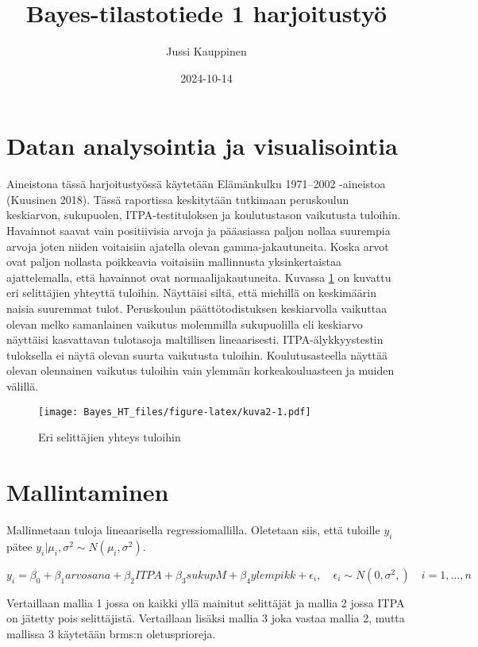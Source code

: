 \documentclass[
]{article}
\title{Bayes-tilastotiede 1 harjoitustyö}
\author{Jussi Kauppinen}
\date{2024-10-14}
\begin{document}
\maketitle

{
\setcounter{tocdepth}{2}
\tableofcontents
}
\section{Datan analysointia ja visualisointia}\label{datan-analysointia-ja-visualisointia}

Aineistona tässä harjoitustyössä käytetään Elämänkulku 1971--2002 -aineistoa (Kuusinen 2018). Tässä raportissa keskitytään tutkimaan peruskoulun keskiarvon, sukupuolen, ITPA-testituloksen ja koulutustason vaikutusta tuloihin. Havainnot saavat vain positiivisia arvoja ja pääasiassa paljon nollaa suurempia arvoja joten niiden voitaisiin ajatella olevan gamma-jakautuneita. Koska arvot ovat paljon nollasta poikkeavia voitaisiin mallinnusta yksinkertaistaa ajattelemalla, että havainnot ovat normaalijakautuneita. Kuvassa \ref{fig:kuva2} on kuvattu eri selittäjien yhteyttä tuloihin. Näyttäisi siltä, että miehillä on keskimäärin naisia suuremmat tulot. Peruskoulun päättötodistuksen keskiarvolla vaikuttaa olevan melko samanlainen vaikutus molemmilla sukupuolilla eli keskiarvo näyttäisi kasvattavan tulotasoja maltillisen lineaarisesti. ITPA-älykkyystestin tuloksella ei näytä olevan suurta vaikutusta tuloihin. Koulutusasteella näyttää olevan olennainen vaikutus tuloihin vain ylemmän korkeakouluasteen ja muiden välillä.

\begin{figure}
\centering
\texttt{[image: Bayes\_HT\_files/figure-latex/kuva2-1.pdf]}
\caption{\label{fig:kuva2}Eri selittäjien yhteys tuloihin}
\end{figure}

\section{Mallintaminen}\label{mallintaminen}

Mallinnetaan tuloja lineaarisella regressiomallilla. Oletetaan siis, että tuloille \(y_i\) pätee \(y_i|\mu_i,\sigma^2 \sim N(\mu_i, \sigma^2)\).

\[y_i = \beta_0 + \beta_1 arvosana + \beta_2 ITPA + \beta_3 sukupM + \beta_4ylempikk + \epsilon_i, \quad \epsilon_i \sim N(0, \sigma^2,) \quad i=1,...,n\]

Vertaillaan mallia 1 jossa on kaikki yllä mainitut selittäjät ja mallia 2 jossa ITPA on jätetty pois selittäjistä. Vertaillaan lisäksi mallia 3 joka vastaa mallia 2, mutta mallissa 3 käytetään brms:n oletusprioreja.
\end{document}
